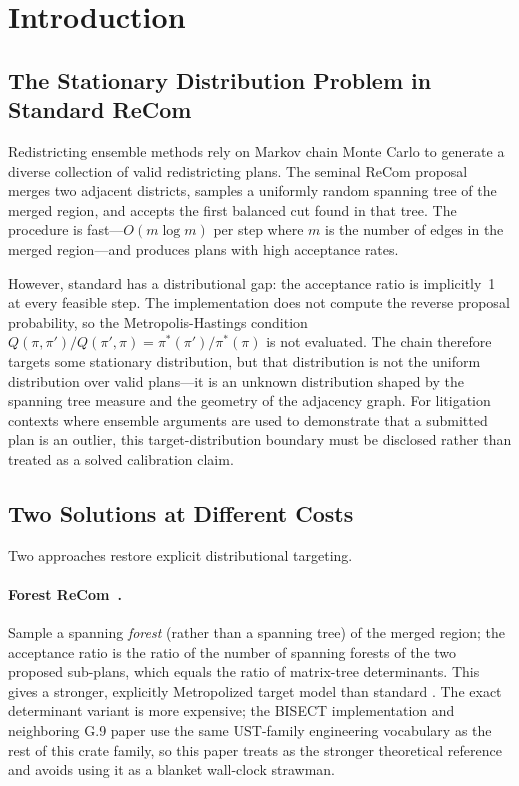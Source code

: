 \section{Introduction}
\label{sec:introduction}

\subsection{The Stationary Distribution Problem in Standard ReCom}

Redistricting ensemble methods rely on Markov chain Monte Carlo to generate
a diverse collection of valid redistricting plans.
The seminal ReCom proposal~\citep{deford2021} merges two adjacent districts,
samples a uniformly random spanning tree of the merged region, and accepts the
first balanced cut found in that tree.
The procedure is fast---$O(m \log m)$ per step where $m$ is the number of
edges in the merged region---and produces plans with high acceptance rates.

However, standard \recom{} has a distributional gap:
the acceptance ratio is implicitly~1 at every feasible step.
The implementation does not compute the reverse proposal probability, so the
Metropolis-Hastings condition
$Q(\pi, \pi') / Q(\pi', \pi) = \pi^*(\pi') / \pi^*(\pi)$ is not evaluated.
The chain therefore targets some stationary distribution, but that
distribution is not the uniform distribution over valid plans---it is an
unknown distribution shaped by the spanning tree measure and the geometry
of the adjacency graph.
For litigation contexts where ensemble arguments are used to demonstrate that
a submitted plan is an outlier, this target-distribution boundary must be
disclosed rather than treated as a solved calibration claim.

\subsection{Two Solutions at Different Costs}

Two approaches restore explicit distributional targeting.

\paragraph{Forest ReCom~\citep{mccartan2020,dellaLibera2026forestRecom}.}
Sample a spanning \emph{forest} (rather than a spanning tree) of the merged
region; the acceptance ratio is the ratio of the number of spanning forests
of the two proposed sub-plans, which equals the ratio of matrix-tree
determinants.
This gives a stronger, explicitly Metropolized target model than standard
\recom{}.
The exact determinant variant is more expensive; the BISECT implementation and
neighboring G.9 paper use the same UST-family engineering vocabulary as the
rest of this crate family, so this paper treats \forestrecom{} as the stronger
theoretical reference and avoids using it as a blanket wall-clock strawman.

